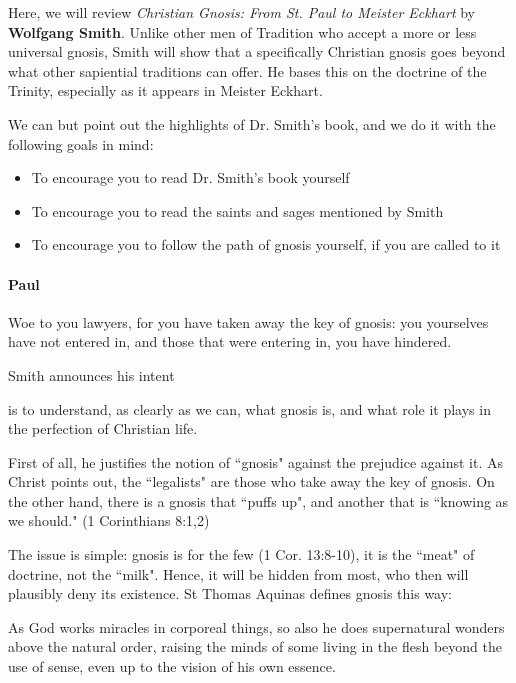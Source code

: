 Here, we will review \emph{Christian Gnosis: From St. Paul to Meister Eckhart} by \textbf{Wolfgang Smith}. Unlike other men of Tradition who accept a more or less universal gnosis, Smith will show that a specifically Christian gnosis goes beyond what other sapiential traditions can offer. He bases this on the doctrine of the Trinity, especially as it appears in Meister Eckhart.

We can but point out the highlights of Dr. Smith's book, and we do it with the following goals in mind:

\begin{itemize}
\item To encourage you to read Dr. Smith's book yourself 
\item To encourage you to read the saints and sages mentioned by Smith 
\item To encourage you to follow the path of gnosis yourself, if you are called to it 
\end{itemize}
\paragraph{Paul}
\begin{quotex}
Woe to you lawyers, for you have taken away the key of gnosis: you yourselves have not entered in, and those that were entering in, you have hindered. 

\end{quotex}
Smith announces his intent

\begin{quotex}
is to understand, as clearly as we can, what gnosis is, and what role it plays in the perfection of Christian life.

\end{quotex}
First of all, he justifies the notion of ``gnosis" against the prejudice against it. As Christ points out, the ``legalists" are those who take away the key of gnosis. On the other hand, there is a gnosis that ``puffs up", and another that is ``knowing as we should." (1 Corinthians 8:1,2)

The issue is simple: gnosis is for the few (1 Cor. 13:8-10), it is the ``meat" of doctrine, not the ``milk". Hence, it will be hidden from most, who then will plausibly deny its existence. St Thomas Aquinas defines gnosis this way:

\begin{quotex}
As God works miracles in corporeal things, so also he does supernatural wonders above the natural order, raising the minds of some living in the flesh beyond the use of sense, even up to the vision of his own essence. 

\end{quotex}
